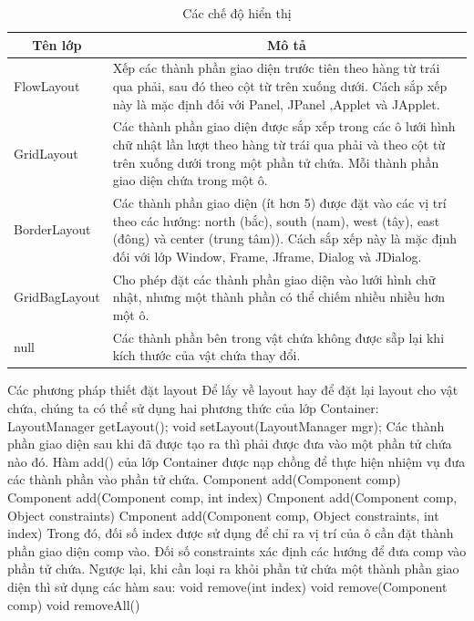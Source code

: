 \begin{center}
	\begin{longtable}{|m{3cm}|m{9cm}|}
		\caption[Các chế độ hiển thị]{Các chế độ hiển thị}
		\label{bang32*}
		\endfirsthead
		\endhead
		\hline
		\multicolumn{1}{|c|}{\textbf{Tên lớp}} &\multicolumn{1}{c|}{	\textbf{ Mô tả}}
		\\ \hline
	
 
FlowLayout  &Xếp các thành phần giao diện trước tiên theo hàng từ trái qua phải,
sau đó theo cột từ trên xuống dưới. Cách sắp xếp này là mặc định
đối với Panel, JPanel ,Applet và JApplet. \\ \hline
GridLayout & Các thành phần giao diện được sắp xếp trong các ô lưới hình chữ
nhật lần lượt theo hàng từ trái qua phải và theo cột từ trên xuống
dưới trong một phần tử chứa. Mỗi thành phần giao diện chứa trong
một ô. \\ \hline
BorderLayout & Các thành phần giao diện (ít hơn 5) được đặt vào các vị trí theo các
hướng: north (bắc), south (nam), west (tây), east (đông) và center
(trung tâm)). Cách sắp xếp này là mặc định đối với lớp Window,
Frame, Jframe, Dialog và JDialog. \\ \hline
GridBagLayout & Cho phép đặt các thành phần giao diện vào lưới hình chữ nhật,
nhưng một thành phần có thể chiếm nhiều nhiều hơn một ô.  \\ \hline
null & Các thành phần bên trong vật chứa không được sẵp lại khi kích
thước của vật chứa thay đổi.
		\\ \hline 
\end{longtable}
\end{center}
Các phương pháp thiết đặt layout
Để lấy về layout hay để đặt lại layout cho vật chứa, chúng ta có thể sử dụng hai
phương thức của lớp Container:
LayoutManager getLayout();
void setLayout(LayoutManager mgr);
Các thành phần giao diện sau khi đã được tạo ra thì phải được đưa vào một phần
tử chứa nào đó. Hàm add() của lớp Container được nạp chồng để thực hiện nhiệm
vụ đưa các thành phần vào phần tử chứa.
Component add(Component comp)
Component add(Component comp, int index)
Cmponent add(Component comp, Object constraints)
Cmponent add(Component comp, Object constraints, int index)
Trong đó, đối số index được sử dụng để chỉ ra vị trí của ô cần đặt thành phần giao
diện comp vào. Đối số constraints xác định các hướng để đưa comp vào phần tử
chứa.
Ngược lại, khi cần loại ra khỏi phần tử chứa một thành phần giao diện thì sử dụng
các hàm sau:
void remove(int index)
void remove(Component comp)
void removeAll()
